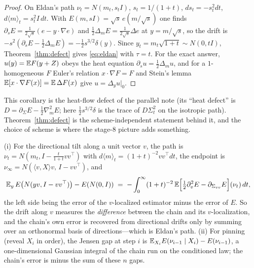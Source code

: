 \begin{proof}
On Eldan's path $\nu_t=N(m_t,s_tI)$, $s_t=1/(1+t)$, $ds_t=-s_t^2dt$, $d\langle m\rangle_t=s_t^2I\,dt$. With
$E(m,sI)=\sqrt s\,e(m/\sqrt s)$ one finds $\partial_sE=\tfrac1{2\sqrt s}(e-y\cdot\nabla e)$ and $\tfrac12\Delta_mE=
\tfrac1{2\sqrt s}\Delta e$ at $y=m/\sqrt s$, so the drift is $-s^2(\partial_sE-\tfrac12\Delta_mE)=-\tfrac12 s^{3/2}\delta(y)$.
Since $y_t=m_t\sqrt{1+t}\sim N(0,tI)$, Theorem~\ref{thm:defect} gives \eqref{eq:eldan} with $\tau=t$. For the exact
answer, $u(y)=\mathbb E F(y+Z)$ obeys the heat equation $\partial_s u=\tfrac12\Delta_mu$, and for a $1$-homogeneous $F$ Euler's
relation $x\cdot\nabla F=F$ and Stein's lemma $\mathbb E[x\cdot\nabla F(x)]=\mathbb E\,\Delta F(x)$ give $u=\Delta_yu|_0$.
\end{proof}

This corollary is the heat-flow defect of the parallel note (its ``heat defect'' is $D=\partial_\Sigma E-\tfrac12\nabla_m^2E$;
here $\tfrac12 s^{3/2}\delta$ is the trace of $D\Sigma_t^2$ on the isotropic path). Theorem~\ref{thm:defect} is the
scheme-independent statement behind it, and the choice of scheme is where the stage-8 picture adds something.

\begin{corollary}\label{cor:directional}
(i) For the directional tilt along a unit vector $v$, the path is $\nu_t=N(m_t,I-\tfrac{t}{1+t}vv^\top)$ with
$d\langle m\rangle_t=(1+t)^{-2}vv^\top dt$, the endpoint is $\nu_\infty=N(\langle v,X\rangle v,\,I-vv^\top)$, and
\[
\mathbb E_{y}\,E\big(N(yv,I-vv^\top)\big)-E(N(0,I))\;=\;-\int_0^\infty(1+t)^{-2}\,\mathbb E\Big[\tfrac12\partial_v^2E-\partial_{\Sigma_{vv}}E\Big](\nu_t)\,dt ,
\]
the left side being the error of the $v$-localized estimator minus the error of $E$. So the drift along $v$ measures
the \emph{difference} between the chain and its $v$-localization, and the chain's own error is recovered from
directional drifts only by summing over an orthonormal basis of directions---which is Eldan's path.
(ii) For pinning (reveal $X_i$ in order), the Jensen gap at step $i$ is
$\mathbb E_{X_i}E(\nu_{i-1}\mid X_i)-E(\nu_{i-1})$, a one-dimensional Gaussian integral of the chain run on the conditioned
law; the chain's error is minus the sum of these $n$ gaps.
\end{corollary}

